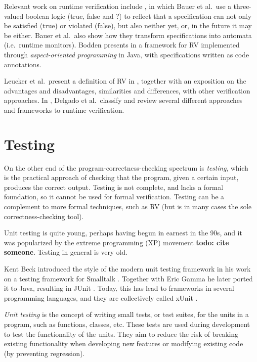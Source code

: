 \documentclass[a4paper,11pt]{kth-mag}
\newcommand{\todo}[1]{\textbf{todo: #1}}
\begin{document}
Relevant work on runtime verification include \cite{bauer06monitoring}, in
which Bauer et al.\ use a three-valued boolean logic (true, false and ?) to
reflect that a specification can not only be satisfied (true) or violated
(false), but also neither yet, or, in the future it may be either. Bauer et
al.\ also show how they transform specifications into automata (i.e.\ runtime
monitors). Bodden presents in \cite{bodden05efficientrv} a framework for RV
implemented through \emph{aspect-oriented programming} \cite{aspectj} in Java,
with specifications written as code annotations.

Leucker et al.\ present a definition of RV in \cite{leucker09abriefaccount},
together with an exposition on the advantages and disadvantages, similarities
and differences, with other verification approaches. In
\cite{delgado04taxonomy}, Delgado et al.\ classify and review several different
approaches and frameworks to runtime verification.


\section{Testing} \label{section-testing}
On the other end of the program-correctness-checking spectrum is
\emph{testing}, which is the practical approach of checking that the program,
given a certain input, produces the correct output.  Testing is not complete,
and lacks a formal foundation, so it cannot be used for formal verification.
Testing can be a complement to more formal techniques, such as RV (but is in
many cases the sole correctness-checking tool).

Unit testing is quite young, perhaps having begun in earnest in the 90s, and it
was popularized by the extreme programming (XP) movement \todo{cite someone}.
Testing in general is very old.

Kent Beck introduced the style of the modern unit testing framework in his work
on a testing framework  for Smalltalk \cite{becksmalltalktesting}.  Together
with Eric Gamma he later ported it to Java, resulting in JUnit \cite{junit}.
Today, this has lead to frameworks in several programming languages, and they
are collectively called xUnit \cite{fowlerxunit}.

\textit{Unit testing} is the concept of writing small tests, or test suites,
for the units in a program, such as functions, classes, etc. These tests are
used during development to test the functionality of the units. They aim to
reduce the risk of breaking existing functionality when developing new features
or modifying existing code (by preventing regression).
\end{document}
